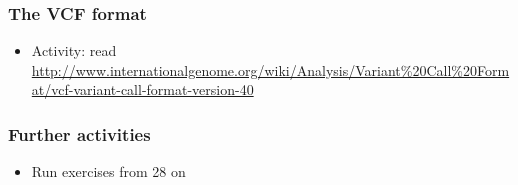 \documentclass{beamer}
\begin{document}
\begin{frame}
  \frametitle{The VCF format}
  \begin{itemize}
  \item Activity: read \url{http://www.internationalgenome.org/wiki/Analysis/Variant\%20Call\%20Format/vcf-variant-call-format-version-40}
  \end{itemize}
\end{frame}





















\begin{frame}
  \frametitle{Further activities}
  \begin{itemize}
  \item Run exercises from 28 on
  \end{itemize}
\end{frame}
\end{document}
